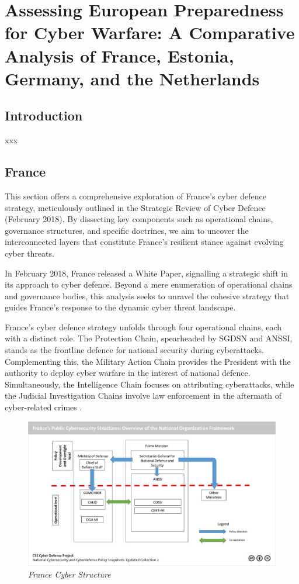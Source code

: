 \chapter{Assessing European Preparedness for Cyber Warfare: A Comparative Analysis of France, Estonia, Germany, and the Netherlands}


\section{Introduction}
xxx

\section{France}

This section offers a comprehensive exploration of France's cyber defence strategy, meticulously outlined in the Strategic Review of Cyber Defence (February 2018). By dissecting key components such as operational chains, governance structures, and specific doctrines, we aim to uncover the interconnected layers that constitute France's resilient stance against evolving cyber threats.

In February 2018, France released a White Paper, signalling a strategic shift in its approach to cyber defence. Beyond a mere enumeration of operational chains and governance bodies, this analysis seeks to unravel the cohesive strategy that guides France's response to the dynamic cyber threat landscape.

France's cyber defence strategy unfolds through four operational chains, each with a distinct role. The Protection Chain, spearheaded by SGDSN and ANSSI, stands as the frontline defence for national security during cyberattacks. Complementing this, the Military Action Chain provides the President with the authority to deploy cyber warfare in the interest of national defence. Simultaneously, the Intelligence Chain focuses on attributing cyberattacks, while the Judicial Investigation Chains involve law enforcement in the aftermath of cyber-related crimes \autocite{sgdsn_2018_strategic, anssi_2022_le}.

\begin{figure}[H]
    \centering
    \includegraphics[width=1\textwidth]{Images/france.jpg}
    \caption{\textit{France Cyber Structure}}
    \label{fig:france}
\end{figure}

